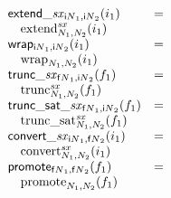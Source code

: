 $$
\begin{array}[t]{@{}lcl@{}l@{}}
{{\mathsf{extend}}{\mathsf{\_}}{{\mathit{sx}}}}{{}_{{{\mathsf{i}}{N}}_1, {{\mathsf{i}}{N}}_2}(i_1)} & = & & \\
 \multicolumn{4}{@{}l@{}}{\quad
\begin{array}[t]{@{}l@{}}
{{{{\mathrm{extend}}}_{N_1, N_2}^{{\mathit{sx}}}}}{(i_1)} \\
\end{array}
} \\
{\mathsf{wrap}}{{}_{{{\mathsf{i}}{N}}_1, {{\mathsf{i}}{N}}_2}(i_1)} & = & & \\
 \multicolumn{4}{@{}l@{}}{\quad
\begin{array}[t]{@{}l@{}}
{{\mathrm{wrap}}}_{N_1, N_2}(i_1) \\
\end{array}
} \\
{{\mathsf{trunc}}{\mathsf{\_}}{{\mathit{sx}}}}{{}_{{{\mathsf{f}}{N}}_1, {{\mathsf{i}}{N}}_2}(f_1)} & = & & \\
 \multicolumn{4}{@{}l@{}}{\quad
\begin{array}[t]{@{}l@{}}
{{{{\mathrm{trunc}}}_{N_1, N_2}^{{\mathit{sx}}}}}{(f_1)} \\
\end{array}
} \\
{{\mathsf{trunc\_sat}}{\mathsf{\_}}{{\mathit{sx}}}}{{}_{{{\mathsf{f}}{N}}_1, {{\mathsf{i}}{N}}_2}(f_1)} & = & & \\
 \multicolumn{4}{@{}l@{}}{\quad
\begin{array}[t]{@{}l@{}}
{{{{\mathrm{trunc\_sat}}}_{N_1, N_2}^{{\mathit{sx}}}}}{(f_1)} \\
\end{array}
} \\
{{\mathsf{convert}}{\mathsf{\_}}{{\mathit{sx}}}}{{}_{{{\mathsf{i}}{N}}_1, {{\mathsf{f}}{N}}_2}(i_1)} & = & & \\
 \multicolumn{4}{@{}l@{}}{\quad
\begin{array}[t]{@{}l@{}}
{{{{\mathrm{convert}}}_{N_1, N_2}^{{\mathit{sx}}}}}{(i_1)} \\
\end{array}
} \\
{\mathsf{promote}}{{}_{{{\mathsf{f}}{N}}_1, {{\mathsf{f}}{N}}_2}(f_1)} & = & & \\
 \multicolumn{4}{@{}l@{}}{\quad
\begin{array}[t]{@{}l@{}}
{{\mathrm{promote}}}_{N_1, N_2}(f_1) \\
\end{array}
}
\end{array}$$
